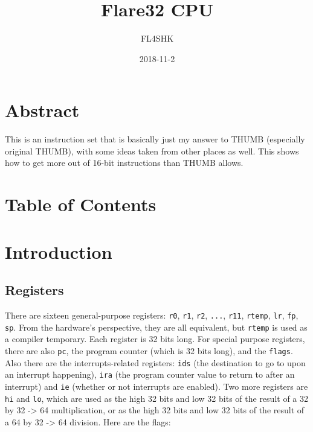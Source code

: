 \documentclass{article}
\title{Flare32 CPU}
\date{2018-11-2}
\author{FL4SHK}
\makeatletter
\renewcommand\tableofcontents{%
    \@starttoc{toc}%
}
\makeatother
\begin{document}
	\maketitle
	\newpage


	\doublespacing
	\section{Abstract}
	\setcounter{section}{-1}
	This is an instruction set that is basically just my answer to THUMB
	(especially original THUMB), with some ideas taken from other places as
	well.  This shows how to get more out of 16-bit instructions than THUMB
	allows.

	\newpage
	\singlespacing
	\section{Table of Contents}
	\tableofcontents
	\newpage

	\doublespacing
	\section{Introduction}
	\subsection{Registers}
	There are sixteen general-purpose registers:  \texttt{r0}, \texttt{r1},
	\texttt{r2}, \texttt{...}, \texttt{r11}, \texttt{rtemp}, \texttt{lr},
	\texttt{fp}, \texttt{sp}.  From the hardware's perspective, they are
	all equivalent, but \texttt{rtemp} is used as a compiler temporary.
	Each register is 32 bits long.  For special purpose registers, there
	are also \texttt{pc}, the program counter (which is 32 bits long), and
	the \texttt{flags}.  Also there are the interrupts-related registers:
	\texttt{ids} (the destination to go to upon an interrupt happening),
	\texttt{ira} (the program counter value to return to after an
	interrupt) and \texttt{ie} (whether or not interrupts are enabled).
	Two more registers are \texttt{hi} and \texttt{lo}, which are used as
	the high 32 bits and low 32 bits of the result of a 32 by 32 -> 64
	multiplication, or as the high 32 bits and low 32 bits of the result of
	a 64 by 32 -> 64 division.  Here are the flags:
\end{document}
